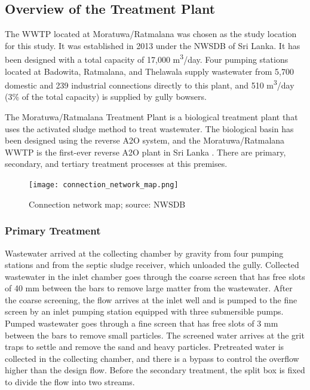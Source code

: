 \subsection{Overview of the Treatment Plant}

The \ac{WWTP} located at Moratuwa/Ratmalana was chosen as the study location for this study. It was established in 2013 under the \ac{NWSDB} of Sri Lanka. It has been designed with a total capacity of 17,000 \unit{m^3}/day. Four pumping stations located at Badowita, Ratmalana, and Thelawala supply wastewater from 5,700 domestic and 239 industrial connections directly to this plant, and 510 \unit{m^3}/day (3\% of the total capacity) is supplied by gully bowsers.

The Moratuwa/Ratmalana Treatment Plant is a biological treatment plant that uses the activated sludge method to treat wastewater. The biological basin has been designed using the reverse A2O system, and the Moratuwa/Ratmalana \ac{WWTP} is the first-ever reverse A2O plant in Sri Lanka \cite{Danushika2016}. There are primary, secondary, and tertiary treatment processes at this premises. 

\begin{figure}[H]
\centering
\texttt{[image: connection\_network\_map.png]}
\caption{Connection network map; source: \ac{NWSDB}}
\label{fig:connection_network_map}
\end{figure}



\subsubsection{Primary Treatment}
Wastewater arrived at the collecting chamber by gravity from four pumping stations and from the septic sludge receiver, which unloaded the gully. Collected wastewater in the inlet chamber goes through the coarse screen that has free slots of 40 mm between the bars to remove large matter from the wastewater. After the coarse screening, the flow arrives at the inlet well and is pumped to the fine screen by an inlet pumping station equipped with three submersible pumps. Pumped wastewater goes through a fine screen that has free slots of 3 mm between the bars to remove small particles. The screened water arrives at the grit traps to settle and remove the sand and heavy particles. Pretreated water is collected in the collecting chamber, and there is a bypass to control the overflow higher than the design flow. Before the secondary treatment, the split box is fixed to divide the flow into two streams.

